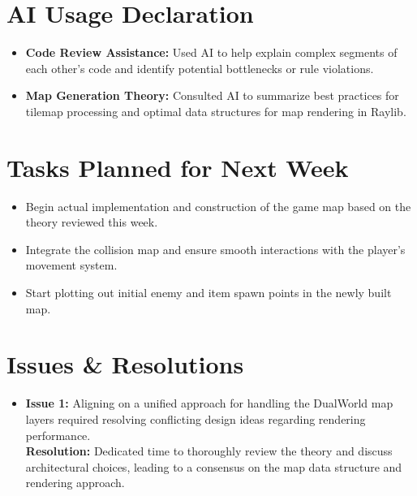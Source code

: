 \documentclass[12pt,a4paper]{article}
\begin{document}
\section*{AI Usage Declaration}
\begin{itemize}
    \item \textbf{Code Review Assistance:} Used AI to help explain complex segments of each other's code and identify potential bottlenecks or rule violations.
    \item \textbf{Map Generation Theory:} Consulted AI to summarize best practices for tilemap processing and optimal data structures for map rendering in Raylib.
\end{itemize}

\section*{Tasks Planned for Next Week}
\begin{itemize}
    \item Begin actual implementation and construction of the game map based on the theory reviewed this week.
    \item Integrate the collision map and ensure smooth interactions with the player's movement system.
    \item Start plotting out initial enemy and item spawn points in the newly built map.
\end{itemize}

\section*{Issues \& Resolutions}
\begin{itemize}
    \item \textbf{Issue 1:} Aligning on a unified approach for handling the DualWorld map layers required resolving conflicting design ideas regarding rendering performance. \\
    \textbf{Resolution:} Dedicated time to thoroughly review the theory and discuss architectural choices, leading to a consensus on the map data structure and rendering approach.
\end{itemize}
\end{document}
